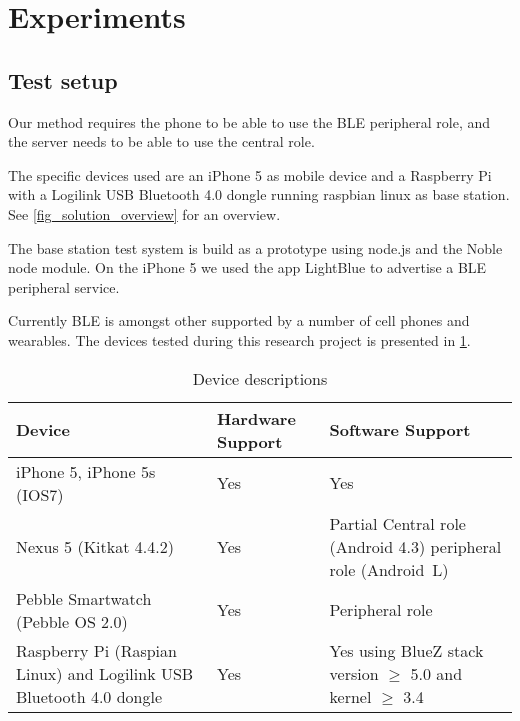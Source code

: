 \section{Experiments}

\subsection{Test setup}

Our method requires the phone to be able to use the BLE peripheral role, and the server needs to be able to use the central role.

The specific devices used are an iPhone 5 as mobile device and a Raspberry Pi with a Logilink USB Bluetooth 4.0 dongle running raspbian linux as base station. See \cref{fig_solution_overview} for an overview.

The base station test system is build as a prototype using node.js and the Noble node module.
On the iPhone 5 we used the app LightBlue to advertise a BLE peripheral service.

Currently BLE is amongst other supported by a number of cell phones and wearables. 
The devices tested during this research project is presented in \cref{table:devices}.

\begin{table}[!t]
\caption{Device descriptions}
\label{table:devices}
\centering
\begin{tabular}{|p{2.3cm}|p{1.3cm}|p{3.9cm}|}
\hline
\textbf{Device} & \textbf{Hardware Support} & \textbf{Software Support}\\
\hline
iPhone 5, iPhone 5s (IOS7) & Yes & Yes\\
\hline
Nexus 5 \newline (Kitkat 4.4.2) & Yes & Partial \newline
Central role (Android 4.3)  \newline
peripheral role (Android~L)\\
\hline
Pebble Smartwatch (Pebble OS 2.0) & Yes & Peripheral role\\
\hline
Raspberry Pi (Raspian Linux) and Logilink USB Bluetooth 4.0 dongle & Yes & Yes using BlueZ stack version $\geq$ 5.0 and kernel $\geq$ 3.4\\
\hline

\end{tabular}
\end{table}

